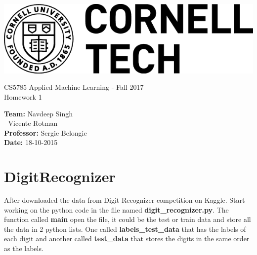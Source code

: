 \documentclass[11pt,letterpaper]{article}
\begin{document}
\lstset{language=SQL}
\newpage
 \includegraphics[scale=0.9]{img/logo.png}
\vspace*{7cm}
\begin{center}
\Large{CS5785 Applied Machine Learning - Fall 2017} \\
\vspace{3mm}
\huge{Homework 1}
\end{center}

\vfill
\begin{flushright}
\begin{minipage}{.45\linewidth}
\textbf{Team:} \hspace{5.5em} Navdeep Singh\\
\textcolor{white}{.} \hspace{8.1em} Vicente Rotman\\
\textbf{Professor:} \hspace{3.9em} Sergie Belongie\\
\textbf{Date:} \hspace{6.2em}18-10-2015 
\end{minipage}
\end{flushright}
\newpage


\section{DigitRecognizer}
After downloaded the data from Digit Recognizer competition on Kaggle. Start working on the python code in the file named \textbf{digit\_recognizer.py}. The function called \textbf{main} open the file, it could be the test or train data and store all the data in 2 python lists. One called \textbf{labels\_test\_data} that has the labels of each digit and another called \textbf{test\_data} that stores the digits in the same order as the labels.
\end{document}
